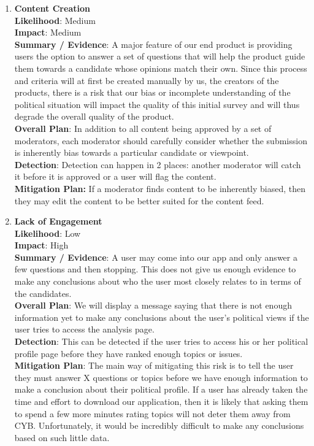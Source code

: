 \documentclass[11pt]{article}
\begin{document}
\begin{enumerate}[nolistsep]
    \item \textbf{Content Creation}\\
        \textbf{Likelihood}: Medium\\
        \textbf{Impact}: Medium\\
        \textbf{Summary / Evidence}: A major feature of our end product is providing users the option to answer a set of questions that will help the product guide them towards a candidate whose opinions match their own. Since this process and criteria will at first be created manually by us, the creators of the products, there is a risk that our bias or incomplete understanding of the political situation will impact the quality of this initial survey and will thus degrade the overall quality of the product.\\
        \textbf{Overall Plan}: In addition to all content being approved by a set of moderators, each moderator should carefully consider whether the submission is inherently bias towards a particular candidate or viewpoint. \\
        \textbf{Detection}: Detection can happen in 2 places: another moderator will catch it before it is approved or a user will flag the content.\\
        \textbf{Mitigation Plan:} If a moderator finds content to be inherently biased, then they may edit the content to be better suited for the content feed.\\[-10pt]

    \item \textbf{Lack of Engagement}\\
        \textbf{Likelihood}: Low\\
        \textbf{Impact}: High\\
        \textbf{Summary / Evidence}: A user may come into our app and only answer a few questions and then stopping. This does not give us enough evidence to make any conclusions about who the user most closely relates to in terms of the candidates. \\
        \textbf{Overall Plan}: We will display a message saying that there is not enough information yet to make any conclusions about the user's political views if the user tries to access the analysis page. \\
        \textbf{Detection}: This can be detected if the user tries to access his or her political profile page before they have ranked enough topics or issues.\\
        \textbf{Mitigation Plan}: The main way of mitigating this risk is to tell the user they must answer X questions or topics before we have enough information to make a conclusion about their political profile. If a user has already taken the time and effort to download our application, then it is likely that asking them to spend a few more minutes rating topics will not deter them away from CYB. Unfortunately, it would be incredibly difficult to make any conclusions based on such little data.\\[-10pt]


\end{enumerate}
\end{document}
